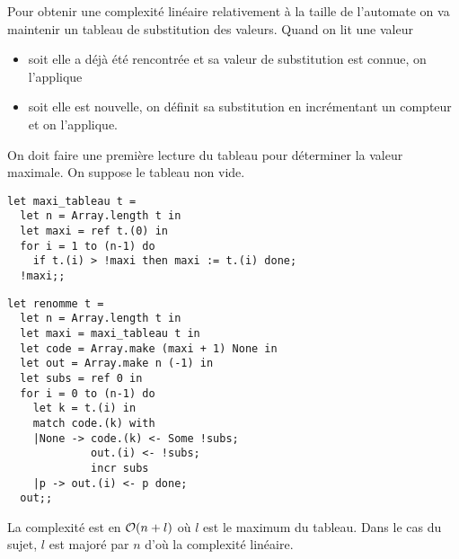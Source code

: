 \begin{Exercise}
Pour obtenir une complexité linéaire relativement à la taille de l'automate on va maintenir un tableau de substitution des valeurs. Quand on lit une valeur
\begin{itemize}
  \item soit elle a déjà été rencontrée et sa valeur de substitution est connue, on l'applique
  \item soit elle est nouvelle, on définit sa substitution en incrémentant un compteur et on l'applique.
\end{itemize}
On doit faire une première lecture du tableau pour déterminer la valeur maximale. On suppose le tableau non vide.
\begin{lstlisting}
let maxi_tableau t =
  let n = Array.length t in
  let maxi = ref t.(0) in
  for i = 1 to (n-1) do
    if t.(i) > !maxi then maxi := t.(i) done;
  !maxi;;
\end{lstlisting}

\begin{lstlisting}
let renomme t =
  let n = Array.length t in
  let maxi = maxi_tableau t in
  let code = Array.make (maxi + 1) None in
  let out = Array.make n (-1) in
  let subs = ref 0 in
  for i = 0 to (n-1) do
    let k = t.(i) in
    match code.(k) with
    |None -> code.(k) <- Some !subs;
             out.(i) <- !subs;
             incr subs
    |p -> out.(i) <- p done;
  out;;
\end{lstlisting}

La complexité est en ${\cal O}(n +l)$ où $l$ est le maximum du tableau. Dans le cas du sujet, $l$ est majoré par $n$ d'où la complexité linéaire.
\end{Exercise}
